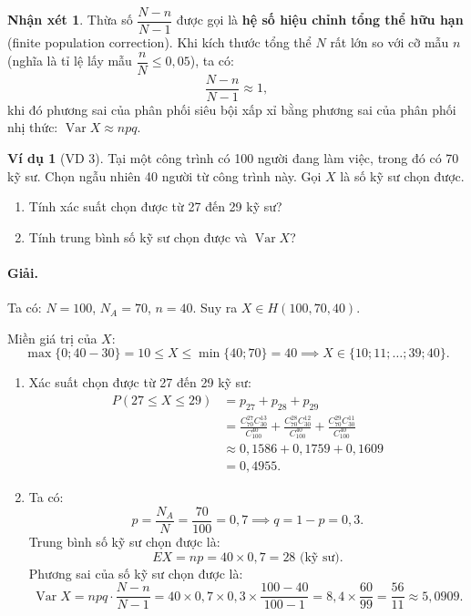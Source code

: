\documentclass[12pt,a4paper]{article}
\theoremstyle{definition}
\newtheorem{vidu}{Ví dụ}[section]
\newtheorem{nhanxet}{Nhận xét}[section]
\begin{document}
\begin{nhanxet}
Thừa số $\dfrac{N - n}{N - 1}$ được gọi là \textbf{hệ số hiệu chỉnh tổng thể hữu hạn} (finite population correction). Khi kích thước tổng thể $N$ rất lớn so với cỡ mẫu $n$ (nghĩa là tỉ lệ lấy mẫu $\dfrac{n}{N} \le 0{,}05$), ta có:
\[
\frac{N - n}{N - 1} \approx 1,
\]
khi đó phương sai của phân phối siêu bội xấp xỉ bằng phương sai của phân phối nhị thức: $\operatorname{Var} X \approx npq$.
\end{nhanxet}

\begin{vidu}[VD 3]
Tại một công trình có 100 người đang làm việc, trong đó có 70 kỹ sư. Chọn ngẫu nhiên 40 người từ công trình này. Gọi $X$ là số kỹ sư chọn được.
\begin{enumerate}[label=\arabic*)]
    \item Tính xác suất chọn được từ 27 đến 29 kỹ sư?
    \item Tính trung bình số kỹ sư chọn được và $\operatorname{Var} X$?
\end{enumerate}

\paragraph{Giải.}
Ta có: $N = 100$, $N_A = 70$, $n = 40$. Suy ra $X \in H(100, 70, 40)$.

Miền giá trị của $X$:
\[
\max\{0; 40 - 30\} = 10 \le X \le \min\{40; 70\} = 40 \implies X \in \{10; 11; \dots; 39; 40\}.
\]

\begin{enumerate}[label=\arabic*)]
    \item Xác suất chọn được từ 27 đến 29 kỹ sư:
    \begin{align*}
    P(27 \le X \le 29) &= p_{27} + p_{28} + p_{29} \\
    &= \frac{C_{70}^{27} C_{30}^{13}}{C_{100}^{40}} + \frac{C_{70}^{28} C_{30}^{12}}{C_{100}^{40}} + \frac{C_{70}^{29} C_{30}^{11}}{C_{100}^{40}} \\
    &\approx 0{,}1586 + 0{,}1759 + 0{,}1609 \\
    &= 0{,}4955.
    \end{align*}

    \item Ta có:
    \[
    p = \frac{N_A}{N} = \frac{70}{100} = 0{,}7 \implies q = 1 - p = 0{,}3.
    \]
    Trung bình số kỹ sư chọn được là:
    \[
    EX = np = 40 \times 0{,}7 = 28 \text{ (kỹ sư)}.
    \]
    Phương sai của số kỹ sư chọn được là:
    \[
    \operatorname{Var} X = npq \cdot \frac{N - n}{N - 1} = 40 \times 0{,}7 \times 0{,}3 \times \frac{100 - 40}{100 - 1} = 8{,}4 \times \frac{60}{99} = \frac{56}{11} \approx 5{,}0909.
    \]
\end{enumerate}
\end{vidu}
\end{document}
